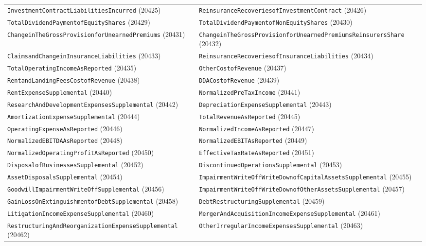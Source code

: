 \documentclass[11pt,a4paper]{report}
\begin{document}
\begin{subappendices}
{\begin{longtable}{@{}p{}p{}@{}}
\texttt{InvestmentContractLiabilitiesIncurred} (20425) & \texttt{ReinsuranceRecoveriesofInvestmentContract} (20426) \\
\texttt{TotalDividendPaymentofEquityShares} (20429) & \texttt{TotalDividendPaymentofNonEquityShares} (20430) \\
\texttt{ChangeinTheGrossProvisionforUnearnedPremiums} (20431) & \texttt{ChangeinTheGrossProvisionforUnearnedPremiumsReinsurersShare} (20432) \\
\texttt{ClaimsandChangeinInsuranceLiabilities} (20433) & \texttt{ReinsuranceRecoveriesofInsuranceLiabilities} (20434) \\
\texttt{TotalOperatingIncomeAsReported} (20435) & \texttt{OtherCostofRevenue} (20437) \\
\texttt{RentandLandingFeesCostofRevenue} (20438) & \texttt{DDACostofRevenue} (20439) \\
\texttt{RentExpenseSupplemental} (20440) & \texttt{NormalizedPreTaxIncome} (20441) \\
\texttt{ResearchAndDevelopmentExpensesSupplemental} (20442) & \texttt{DepreciationExpenseSupplemental} (20443) \\
\texttt{AmortizationExpenseSupplemental} (20444) & \texttt{TotalRevenueAsReported} (20445) \\
\texttt{OperatingExpenseAsReported} (20446) & \texttt{NormalizedIncomeAsReported} (20447) \\
\texttt{NormalizedEBITDAAsReported} (20448) & \texttt{NormalizedEBITAsReported} (20449) \\
\texttt{NormalizedOperatingProfitAsReported} (20450) & \texttt{EffectiveTaxRateAsReported} (20451) \\
\texttt{DisposalofBusinessesSupplemental} (20452) & \texttt{DiscontinuedOperationsSupplemental} (20453) \\
\texttt{AssetDisposalsSupplemental} (20454) & \texttt{ImpairmentWriteOffWriteDownofCapitalAssetsSupplemental} (20455) \\
\texttt{GoodwillImpairmentWriteOffSupplemental} (20456) & \texttt{ImpairmentWriteOffWriteDownofOtherAssetsSupplemental} (20457) \\
\texttt{GainLossOnExtinguishmentofDebtSupplemental} (20458) & \texttt{DebtRestructuringSupplemental} (20459) \\
\texttt{LitigationIncomeExpenseSupplemental} (20460) & \texttt{MergerAndAcquisitionIncomeExpenseSupplemental} (20461) \\
\texttt{RestructuringAndReorganizationExpenseSupplemental} (20462) & \texttt{OtherIrregularIncomeExpensesSupplemental} (20463) \\
\bottomrule
\end{longtable}}


\end{subappendices}
\end{document}
